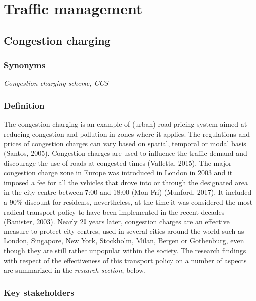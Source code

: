 \documentclass[
]{book}
\begin{document}
\hypertarget{traffic}{%
\chapter{Traffic management}\label{traffic}}

\hypertarget{congestion_charging}{%
\section{Congestion charging}\label{congestion_charging}}

\hypertarget{synonyms-4}{%
\subsection*{Synonyms}\label{synonyms-4}}

\emph{Congestion charging scheme, CCS}

\hypertarget{definition-4}{%
\subsection*{Definition}\label{definition-4}}

The congestion charging is an example of (urban) road pricing system aimed at reducing congestion and pollution in zones where it applies. The regulations and prices of congestion charges can vary based on spatial, temporal or modal basis (Santos, 2005). Congestion charges are used to influence the traffic demand and discourage the use of roads at congested times (Valletta, 2015). The major congestion charge zone in Europe was introduced in London in 2003 and it imposed a fee for all the vehicles that drove into or through the designated area in the city centre between 7:00 and 18:00 (Mon-Fri) (Munford, 2017). It included a 90\% discount for residents, nevertheless, at the time it was considered the most radical transport policy to have been implemented in the recent decades (Banister, 2003). Nearly 20 years later, congestion charges are an effective measure to protect city centres, used in several cities around the world such as London, Singapore, New York, Stockholm, Milan, Bergen or Gothenburg, even though they are still rather unpopular within the society. The research findings with respect of the effectiveness of this transport policy on a number of aspects are summarized in the \emph{research section}, below.

\hypertarget{key-stakeholders-4}{%
\subsection*{Key stakeholders}\label{key-stakeholders-4}}
\end{document}
